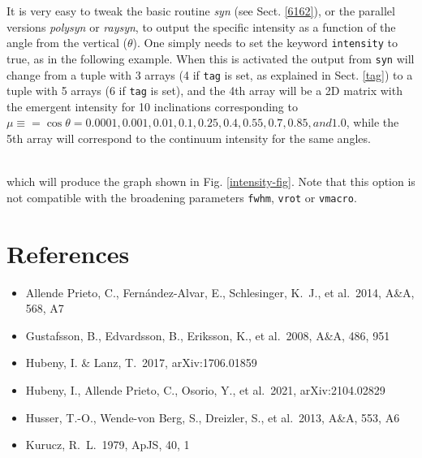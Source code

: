 \documentclass[]{article}
\begin{document}
It is very easy to tweak the basic routine {\it syn} (see Sect. \ref{6162}), 
or the parallel versions {\it polysyn} or {\it raysyn}, to output the 
specific intensity as a function of the angle from the vertical ($\theta$). 
One simply needs to set the keyword {\tt intensity} to true, as in the 
following example. When this is activated the output from {\tt syn} will 
change from a tuple with 3 arrays (4 if {\tt tag} is set, 
as explained in Sect. \ref{tag}) to a tuple with 5 arrays 
(6 if {\tt tag} is set), and 
the 4th array will be a 2D matrix with the emergent intensity for 
10 inclinations corresponding to 
$\mu \equiv = \cos \theta = 0.0001, 0.001, 0.01, 0.1, 0.25, 0.4, 0.55, 0.7, 0.85, and 1.0$, while the 5th array will correspond to the continuum intensity
for the same angles.
\\
\\

\noindent which will produce the graph shown in Fig. \ref{intensity-fig}. Note that this option is not compatible with the broadening parameters {\tt fwhm}, {\tt vrot} or {\tt vmacro}.


\section{References}

\begin{itemize}
\item Allende Prieto, C., Fern{\'a}ndez-Alvar, E., Schlesinger, K.~J., et al.\ 2014, A\&A, 568, A7 
\item Gustafsson, B., Edvardsson, B., Eriksson, K., et al.\ 2008, A\&A, 486, 951
\item Hubeny, I. \& Lanz, T.\ 2017, arXiv:1706.01859
\item Hubeny, I., Allende Prieto, C., Osorio, Y., et al.\ 2021, arXiv:2104.02829
\item Husser, T.-O., Wende-von Berg, S., Dreizler, S., et al.\ 2013, A\&A, 553, A6
\item Kurucz, R.~L.\ 1979, ApJS, 40, 1

\end{itemize}
\end{document}
